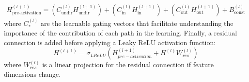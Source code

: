 \documentclass[utf8]{FrontiersinHarvard}
\begin{document}
	\begin{multline}
		H_{\text{pre-activation}}^{(l+1)} = \left( C_{\text{undir}}^{(l)} H_{\text{undir}}^{(l+1)} \right) + \left( C_{\text{in}}^{(l)} H_{\text{in}}^{(l+1)} \right)
		+ \left( C_{\text{out}}^{(l)} H_{\text{out}}^{(l+1)} \right) + B_{\text{const}}^{(l)}
	\end{multline}
	where $C_*^{(l)}$ are the learnable gating vectors that facilitate understanding the importance of the contribution of each path in the learning. Finally, a residual connection is added before applying a Leaky ReLU activation function:
	\begin{equation}
		H^{(l+1)} = \sigma_{LReLU}\left(H_{pre-activation}^{(l+1)} + H^{(l)}W_{res}^{(l)}\right)
	\end{equation}
	where $W_{res}^{(l)}$ is a linear projection for the residual connection if feature dimensions change.
	
\end{document}
